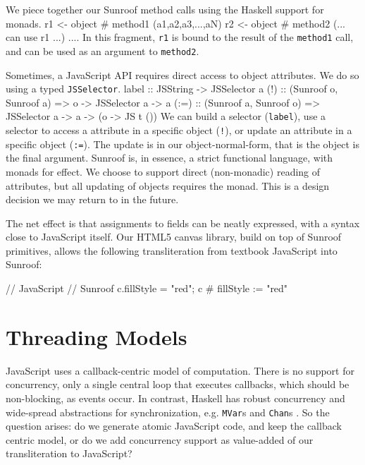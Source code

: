 \documentclass{llncs}
\newcommand{\Src}[1]{{\tt{#1}}}
\newenvironment{Code}{\verbatim}{\endverbatim}
\begin{document}
We piece together our Sunroof method calls using the Haskell support for monads.
\begin{Code}
  r1 <- object # method1 (a1,a2,a3,...,aN)
  r2 <- object # method2 (... can use r1 ...)
  ....
\end{Code} 
In this fragment, \Src{r1} is bound to the result of the \Src{method1} call,
and can be used as an argument to \Src{method2}.

Sometimes, a JavaScript API requires direct access to object attributes.
We do so using a typed \Src{JSSelector}.
\begin{Code}
label :: JSString -> JSSelector a
(!)   :: (Sunroof o, Sunroof a) => o -> JSSelector a -> a
(:=)  :: (Sunroof a, Sunroof o) 
      => JSSelector a -> a -> (o -> JS t ())
\end{Code}
We can build a selector (\Src{label}), use a selector to access a attribute in a specific
object (\Src{!}), or update an attribute in a specific object (\Src{:=}).
The update is in our object-normal-form, that is the object is the final argument.
Sunroof is, in essence, a strict functional language, with monads for effect.
We choose to support direct (non-monadic) reading of attributes, but
all updating of objects requires the monad.
This is a design decision we may return to in the future.

The net effect is that assignments to fields can be neatly expressed,
with a syntax close to JavaScript itself. Our HTML5 canvas library,
build on top of Sunroof primitives, allows the following transliteration
from textbook JavaScript into Sunroof:

\begin{Code}
  // JavaScript                         // Sunroof
  c.fillStyle = "red";                  c # fillStyle := "red"
\end{Code}



\section{Threading Models}
\label{sec:threading-models}

JavaScript uses a callback-centric model of computation. There
is no support for concurrency, only a single central loop that executes
callbacks, which should be non-blocking, as events occur.
In contrast, Haskell has robust concurrency and wide-spread 
abstractions for synchronization, e.g. \Src{MVar}s and \Src{Chan}s
\cite{Jones:96:ConcurrentHaskell}.
So the question arises: do we generate atomic JavaScript code, 
and keep the callback centric model, or do we add concurrency
support as value-added of our transliteration to JavaScript?
\end{document}
